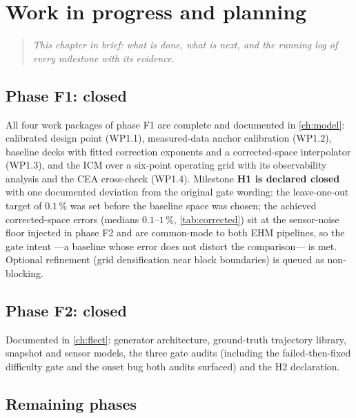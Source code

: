 \chapter{Work in progress and planning}
\label{ch:wip}

\begin{quote}\itshape
This chapter in brief: what is done, what is next, and the running log of every milestone with
its evidence.
\end{quote}

\section{Phase F1: closed}

All four work packages of phase F1 are complete and documented in \cref{ch:model}: calibrated
design point (WP1.1), measured-data anchor calibration (WP1.2), baseline decks with fitted
correction exponents and a corrected-space interpolator (WP1.3), and the ICM over a six-point
operating grid with its observability analysis and the CEA cross-check (WP1.4). Milestone
\textbf{H1 is declared closed} with one documented deviation from the original gate wording:
the leave-one-out target of $0.1\,\%$ was set before the baseline space was chosen; the
achieved corrected-space errors (medians $0.1$--$1\,\%$, \cref{tab:corrected}) sit at the
sensor-noise floor injected in phase F2 and are common-mode to both EHM pipelines, so the gate
intent ---a baseline whose error does not distort the comparison--- is met. Optional
refinement (grid densification near block boundaries) is queued as non-blocking.

\section{Phase F2: closed}

Documented in \cref{ch:fleet}: generator architecture, ground-truth trajectory library,
snapshot and sensor models, the three gate audits (including the failed-then-fixed difficulty
gate and the onset bug both audits surfaced) and the H2 declaration.

\section{Remaining phases}

